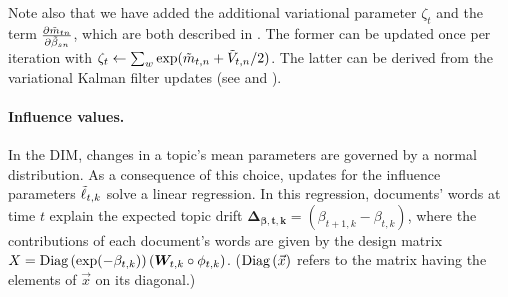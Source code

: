Note also that we have added the additional variational parameter
$\zeta_t$ and the term $\frac{\partial \tilde{m}_{tn}}{\partial \tilde{\beta}_{sn}}$, which are both
described in \cite{blei:2006}. The %
former can be updated once per iteration with $\zeta_t \gets \sum_w
\exp(\tilde{m}_{t,n} + \tilde{V}_{t,n}/2)$. The latter can be derived from the
variational Kalman filter updates (see  and
\cite{blei:2006}).

\paragraph{Influence values.}
In the DIM, changes in a topic's mean parameters are governed by a
normal distribution.  As a consequence of this choice, updates for the
influence parameters $\tilde{\ell}_{t,k}$ solve a linear regression.  In this
regression, documents' words at time $t$ explain the expected topic
drift $\bm{\Delta_{\beta,t,k}} = (\beta_{t+1,k} - \beta_{t,k})$, where
the contributions of each document's words are given by the design
matrix $X = \mbox{Diag}\left( \exp(-\beta_{t,k}) \right) (\bm W_{t,k} \circ \phi_{t,k}
)$. ($\mbox{Diag}\left( \vec{x} \right)$ refers to the matrix having the elements of
$\vec{x}$ on its diagonal.)

